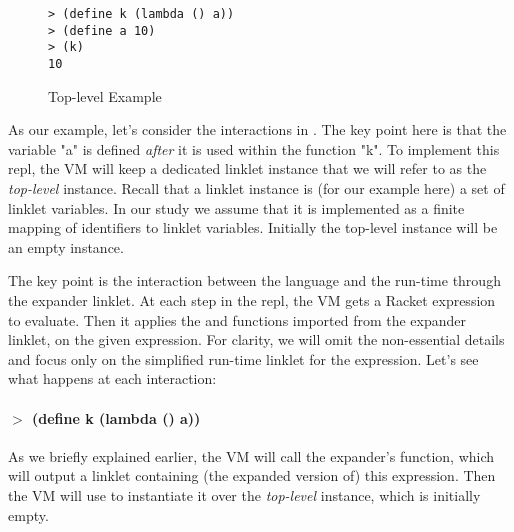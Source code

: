 \begin{wrapfigure}[7]{r}{0.3\textwidth}
  \vspace{-0.7cm}
  \begin{mdframed}
    \begin{verbatim}
> (define k (lambda () a))
> (define a 10)
> (k)
10
\end{verbatim}
    \caption{Top-level Example}
    \label{fig:toplevel-interaction}
  \end{mdframed}
\end{wrapfigure}

As our example, let's consider the interactions in
. The key point here is that the
variable "a" is defined \emph{after} it is used within the function
"k". To implement this repl, the VM will keep a dedicated linklet
instance that we will refer to as the \emph{top-level}
instance. Recall that a linklet instance is (for our example here) a
set of linklet variables. In our study we assume that it is
implemented as a finite mapping of identifiers to linklet
variables. Initially the top-level instance will be an empty instance.

The key point is the interaction between the language and the run-time
through the expander linklet. At each step in the repl, the VM gets a
Racket expression to evaluate. Then it applies the 
and  functions imported from the expander linklet,
on the given expression. For clarity, we will omit the non-essential
details and focus only on the simplified run-time linklet for the
expression. Let's see what happens at each interaction:
\vspace{-0.25cm}
\paragraph{$>$ (define k (lambda () a))}

As we briefly explained earlier, the VM will call the expander's
 function, which will output a linklet containing (the
expanded version of) this expression. Then the VM will use
 to instantiate it over the \emph{top-level}
instance, which is initially empty.

\vspace{-0.3cm}

